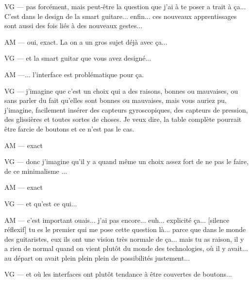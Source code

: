 VG — pas forcément, mais peut-être la question que j'ai à te poser a trait à ça... C'est dans le design de la smart guitare... enfin... ces nouveaux apprentissages sont aussi des fois liés à des nouveaux gestes... 

AM — oui, exact. La on a un gros sujet déjà avec ça... 

VG — et la smart guitar que vous avez designé... 

AM —... l'interface est problématique pour ça. 

VG — j'imagine que c'est un choix qui a des raisons, bonnes ou mauvaises, ou sans parler du fait qu'elles sont bonnes ou mauvaises, mais vous auriez pu, j'imagine, facilement insérer des capteurs gyroscopiques, des capteurs de pression, des glissières et toutes sortes de choses. Je veux dire, la table complète pourrait être farcie de boutons et ce n'est pas le cas. 

AM — exact

VG — donc j'imagine qu'il y a quand même un choix assez fort de ne pas le faire, de ce minimalisme ...

AM — exact 

VG — et qu'est ce qui... 

AM — c'est important ouais... j'ai pas encore... euh... explicité ça... [silence réflexif] tu es le premier qui me pose cette question là... parce que dans le monde des guitaristes, eux ils ont une vision très normale de ça... mais tu as raison, il y a rien de normal quand on vient plutôt du monde des technologies, où il y avait... au départ on avait plein plein plein de possibilités justement... 

VG — et où les interfaces ont plutôt tendance à être couvertes de boutons... 

